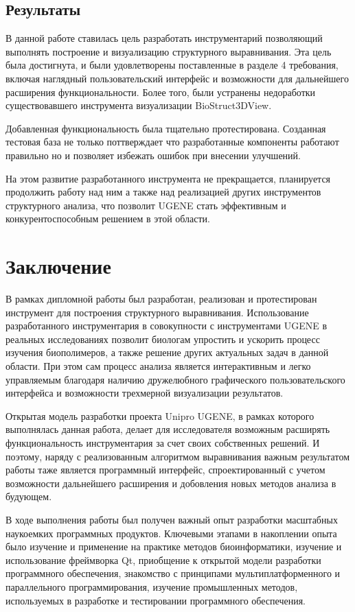 \documentclass[a4paper, 12pt, titlepage, utf8]{extarticle}
\let\oldsection\section         %
\renewcommand{\section}{\newpage\oldsection}
\begin{document}
\subsection{Результаты}
В данной работе ставилась цель разработать инструментарий позволяющий выполнять построение и визуализацию структурного выравнивания. Эта цель была достигнута, и были удовлетворены поставленные в разделе 4 требования, включая наглядный пользовательский интерфейс и возможности для дальнейшего расширения функциональности. Более того, были устранены недоработки существовавшего инструмента визуализации BioStruct3DView.

Добавленная функциональность была тщательно протестирована. Созданная тестовая база не только поттверждает что разработанные компоненты работают правильно но и позволяет избежать ошибок при внесении улучшений.

На этом развитие разработанного инструмента не прекращается, планируется продолжить работу над ним а также над реализацией других инструментов структурного анализа, что позволит UGENE стать эффективным и конкурентоспособным решением в этой области.


\section{Заключение}
В рамках дипломной работы был разработан, реализован и протестирован инструмент для построения структурного выравнивания. Использование разработанного инструментария в совокупности с инструментами UGENE в реальных исследованиях позволит биологам упростить и ускорить процесс изучения биополимеров, а также решение других актуальных задач в данной области. При этом сам процесс анализа является интерактивным и легко управляемым благодаря наличию дружелюбного графического пользовательского интерфейса и возможности трехмерной визуализации результатов.

Открытая модель разработки проекта Unipro UGENE, в рамках которого выполнялась данная работа, делает для исследователя возможным расширять функциональность инструментария за счет своих собственных решений. И поэтому, наряду с реализованным алгоритмом выравнивания важным результатом работы таже является программный интерфейс, спроектированный с учетом возможности дальнейшего расширения и добовления новых методов анализа в будующем.

В ходе выполнения работы был получен важный опыт разработки масштабных наукоемких программных продуктов. Ключевыми этапами в накоплении опыта было изучение и применение на практике методов биоинформатики, изучение и использование фреймворка Qt, приобщение к открытой модели разработки программного обеспечения, знакомство с принципами мультиплатформенного и параллельного программирования, изучение промышленных методов, используемых в разработке и тестировании программного обеспечения.
\end{document}
